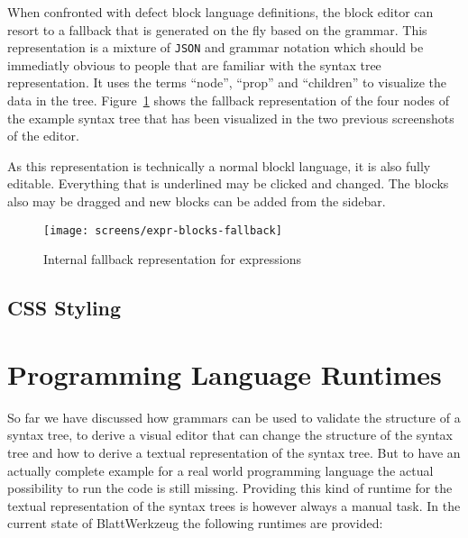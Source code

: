 \documentclass[sigconf,natbib=false,review=true]{acmart}
\begin{document}
When confronted with defect block language definitions, the block editor can resort to a fallback that is generated on the fly based on the grammar. This representation is a mixture of \texttt{JSON} and grammar notation which should be immediatly obvious to people that are familiar with the syntax tree representation. It uses the terms \enquote{node}, \enquote{prop} and \enquote{children} to visualize the data in the tree. Figure~\ref{fig:screen-editor-expr-fallback} shows the fallback representation of the four nodes of the example syntax tree that has been visualized in the two previous screenshots of the editor.

As this representation is technically a normal blockl language, it is also fully editable. Everything that is underlined may be clicked and changed. The blocks also may be dragged and new blocks can be added from the sidebar.

\begin{figure}
  \texttt{[image: screens/expr-blocks-fallback]}
  \caption{Internal fallback representation for expressions}
  \label{fig:screen-editor-expr-fallback}
\end{figure}

\subsection{CSS Styling}

\section{Programming Language Runtimes}

So far we have discussed how grammars can be used to validate the structure of a syntax tree, to derive a visual editor that can change the structure of the syntax tree and how to derive a textual representation of the syntax tree. But to have an actually complete example for a real world programming language the actual possibility to run the code is still missing. Providing this kind of runtime for the textual representation of the syntax trees is however always a manual task. In the current state of Blatt\-Werkzeug the following runtimes are provided:
\end{document}
